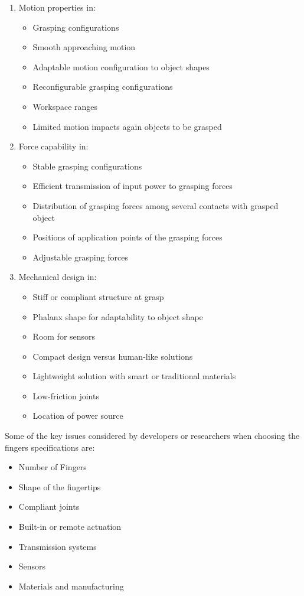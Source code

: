 \documentclass[a4paper, 10pt, conference]{ieeeconf}      %
\begin{document}
\begin{enumerate}
  \item Motion properties in:
  	\begin{itemize}
  		\item Grasping configurations
  		\item Smooth approaching motion
		\item Adaptable motion configuration to object shapes
		\item Reconfigurable grasping configurations
		\item Workspace ranges
		\item Limited motion impacts again objects to be grasped
	\end{itemize}
  \item Force capability in:
  	\begin{itemize}
  		\item Stable grasping configurations
		\item Efficient transmission of input power to grasping forces
		\item Distribution of grasping forces among several contacts with grasped object
		\item Positions of application points of the grasping forces
		\item Adjustable grasping forces
  	\end{itemize}
  \item Mechanical design in:
  	\begin{itemize}
  		\item Stiff or compliant structure at grasp
		\item Phalanx shape for adaptability to object shape
		\item Room for sensors
		\item Compact design versus human-like solutions
		\item Lightweight solution with smart or traditional materials
		\item Low-friction joints
		\item Location of power source\\
  	\end{itemize}
\end{enumerate}
Some of the key issues considered by developers or researchers when choosing the fingers specifications are:\\
	\begin{itemize}
		\item Number of Fingers
		\item Shape of the fingertips
		\item Compliant joints
		\item Built-in or remote actuation
		\item Transmission systems
		\item Sensors
		\item Materials and manufacturing\\
	\end{itemize}
\end{document}
